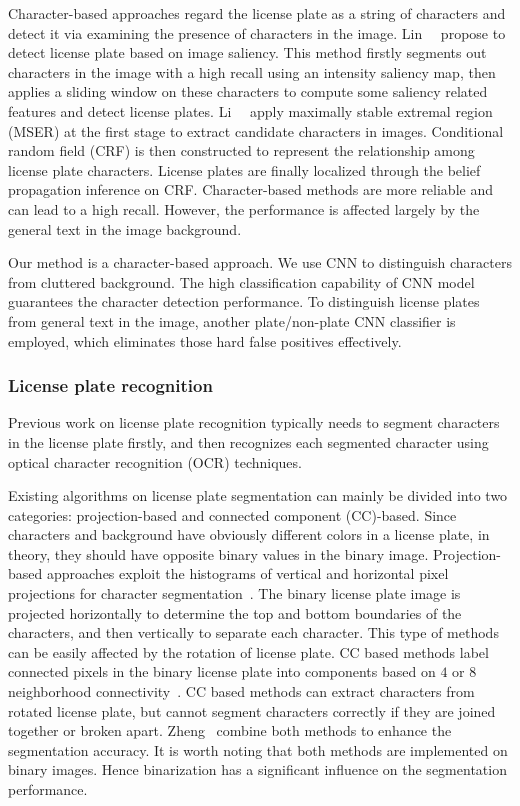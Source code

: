 \documentclass[twocolumn]{svjour3}
\begin{document}
Character-based approaches regard the license plate as a string of characters and detect it via examining the presence of characters in the image. %
Lin~\etal~\cite{Lin2010} propose to detect license plate based on image saliency. This method firstly segments out characters in the image with a high recall using an intensity saliency map, then applies a sliding window on these characters to compute some saliency related features and detect license plates.
Li~\etal~\cite{Li2013}%
apply maximally stable extremal region (MSER) at the first stage to extract candidate characters in images. Conditional random field (CRF) is then constructed to represent the relationship among license plate characters. License plates are finally localized through the belief propagation inference on CRF. Character-based methods are more reliable and can lead to a high recall.
However, the performance is affected largely by the general text in the image background.


Our method is a character-based approach. We use CNN to distinguish characters from cluttered background. The high classification capability of CNN model guarantees the character detection performance.
To distinguish license plates from general text in the image, another plate/non-plate CNN classifier is employed, which eliminates those hard false positives effectively.

\subsubsection{License plate recognition}
Previous work on license plate recognition typically
needs to segment characters in the license plate firstly,
and then recognizes each segmented character using optical character recognition (OCR) techniques.


Existing algorithms on license plate segmentation can mainly be
divided into two categories: projection-based and connected component (CC)-based.
Since characters and background have obviously different colors in a license plate, in theory,
they should have opposite binary values in the binary image.
Projection-based approaches exploit the histograms of vertical and horizontal pixel projections for character segmentation~\cite{Nomura2005,Guo2008,Qiao2010}. %
The binary license plate image is projected horizontally to determine the top and bottom boundaries of the characters, and then vertically to separate each character.
This type of methods can be easily affected by the rotation of license plate.
CC based methods label connected pixels in the binary license plate into components based on $4$ or $8$ neighborhood connectivity~\cite{Chang2004,Giannoukos2006,Giannoukos2010,Jiao2009}. CC based methods can extract characters from rotated license plate, but cannot segment characters correctly if they are joined together or broken apart. %
Zheng\etal~\cite{Zheng2013An} combine both methods to enhance the segmentation accuracy.
It is worth noting that both methods are implemented on binary images. Hence binarization has a significant influence on the segmentation performance. %
\end{document}
